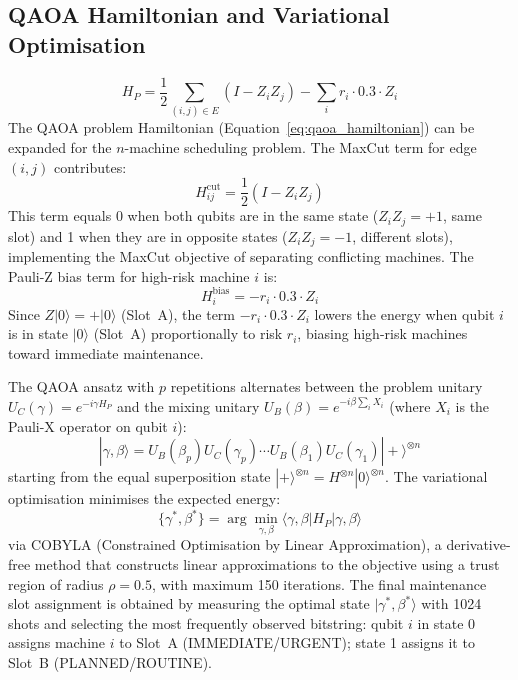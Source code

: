 \subsection{QAOA Hamiltonian and Variational Optimisation}
\begin{equation}
    H_P = \frac{1}{2} \sum_{(i,j) \in E} (I - Z_i Z_j) - \sum_i r_i \cdot 0.3 \cdot Z_i
    \label{eq:qaoa_hamiltonian}
\end{equation}
The QAOA problem Hamiltonian (Equation~\ref{eq:qaoa_hamiltonian}) can be expanded for the $n$-machine scheduling problem. The MaxCut term for edge $(i,j)$ contributes:
\begin{equation}
    H_{ij}^{\text{cut}} = \frac{1}{2}(I - Z_i Z_j)
    \label{eq:maxcut_term}
\end{equation}
This term equals 0 when both qubits are in the same state ($Z_i Z_j = +1$, same slot) and 1 when they are in opposite states ($Z_i Z_j = -1$, different slots), implementing the MaxCut objective of separating conflicting machines. The Pauli-Z bias term for high-risk machine $i$ is:
\begin{equation}
    H_i^{\text{bias}} = -r_i \cdot 0.3 \cdot Z_i
    \label{eq:bias_term}
\end{equation}
Since $Z|0\rangle = +|0\rangle$ (Slot~A), the term $-r_i \cdot 0.3 \cdot Z_i$ lowers the energy when qubit $i$ is in state $|0\rangle$ (Slot~A) proportionally to risk $r_i$, biasing high-risk machines toward immediate maintenance.

The QAOA ansatz with $p$ repetitions alternates between the problem unitary $U_C(\gamma) = e^{-i\gamma H_P}$ and the mixing unitary $U_B(\beta) = e^{-i\beta \sum_i X_i}$ (where $X_i$ is the Pauli-X operator on qubit $i$):
\begin{equation}
    |\gamma, \beta\rangle = U_B(\beta_p) U_C(\gamma_p) \cdots U_B(\beta_1) U_C(\gamma_1) |+\rangle^{\otimes n}
    \label{eq:qaoa_state}
\end{equation}
starting from the equal superposition state $|+\rangle^{\otimes n} = H^{\otimes n}|0\rangle^{\otimes n}$. The variational optimisation minimises the expected energy:
\begin{equation}
    \{\gamma^*, \beta^*\} = \arg\min_{\gamma,\beta} \langle \gamma, \beta | H_P | \gamma, \beta \rangle
    \label{eq:qaoa_opt}
\end{equation}
via COBYLA (Constrained Optimisation by Linear Approximation), a derivative-free method that constructs linear approximations to the objective using a trust region of radius $\rho = 0.5$, with maximum 150 iterations. The final maintenance slot assignment is obtained by measuring the optimal state $|\gamma^*, \beta^*\rangle$ with 1024 shots and selecting the most frequently observed bitstring: qubit $i$ in state 0 assigns machine $i$ to Slot~A (IMMEDIATE/URGENT); state 1 assigns it to Slot~B (PLANNED/ROUTINE).


